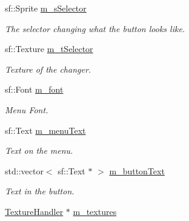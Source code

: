 \begin{DoxyCompactItemize}
\mbox{\label{class_menu_one_a1e7bb22ae51a05f0927fd01e05ea3116}} 
sf\+::\+Sprite \mbox{\hyperlink{class_menu_one_a1e7bb22ae51a05f0927fd01e05ea3116}{m\+\_\+s\+Selector}}
\begin{DoxyCompactList}\small\item\em The selector changing what the button looks like. \end{DoxyCompactList}\item 
\mbox{\label{class_menu_one_a8bd621656e2106144772e92ce2e1d42c}} 
sf\+::\+Texture \mbox{\hyperlink{class_menu_one_a8bd621656e2106144772e92ce2e1d42c}{m\+\_\+t\+Selector}}
\begin{DoxyCompactList}\small\item\em Texture of the changer. \end{DoxyCompactList}\item 
\mbox{\label{class_menu_one_a785b997d5cc3bb1515ba61f45971624a}} 
sf\+::\+Font \mbox{\hyperlink{class_menu_one_a785b997d5cc3bb1515ba61f45971624a}{m\+\_\+font}}
\begin{DoxyCompactList}\small\item\em Menu Font. \end{DoxyCompactList}\item 
\mbox{\label{class_menu_one_a36b54bfaec07fa54a752649fdd29954f}} 
sf\+::\+Text \mbox{\hyperlink{class_menu_one_a36b54bfaec07fa54a752649fdd29954f}{m\+\_\+menu\+Text}}
\begin{DoxyCompactList}\small\item\em Text on the menu. \end{DoxyCompactList}\item 
\mbox{\label{class_menu_one_aa80508cb857fab740bef53b81affd3e0}} 
std\+::vector$<$ sf\+::\+Text $\ast$ $>$ \mbox{\hyperlink{class_menu_one_aa80508cb857fab740bef53b81affd3e0}{m\+\_\+button\+Text}}
\begin{DoxyCompactList}\small\item\em Text in the button. \end{DoxyCompactList}\item 
\mbox{\label{class_menu_one_a56f390ef6e56c20246fa6b5cca02e181}} 
\mbox{\hyperlink{class_texture_handler}{Texture\+Handler}} $\ast$ \mbox{\hyperlink{class_menu_one_a56f390ef6e56c20246fa6b5cca02e181}{m\+\_\+textures}}

\end{DoxyCompactItemize}
